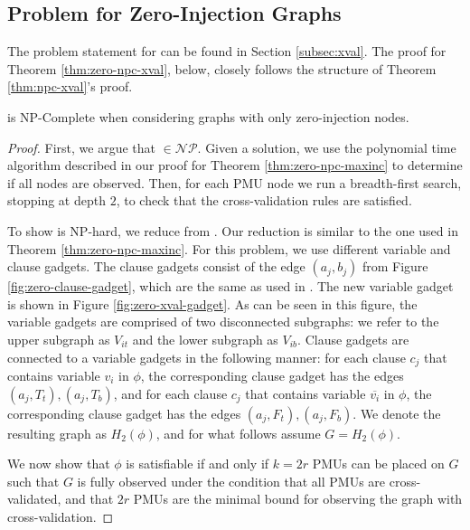 \subsection{\xval Problem for Zero-Injection Graphs}
\label{subsec:zero-xval}

The problem statement for \xval can be found in Section \ref{subsec:xval}.  The proof for Theorem \ref{thm:zero-npc-xval}, below, closely follows the structure of Theorem \ref{thm:npc-xval}'s proof.

\begin{theorem}
\xval is NP-Complete when considering graphs with only zero-injection nodes.   %
\label{thm:zero-npc-xval}
\end{theorem}


\begin{proof}
First, we argue that \xval $\in \mathcal{NP}$.  Given a \xval solution, we use
the polynomial time algorithm described in our proof for Theorem
\ref{thm:zero-npc-maxinc} to determine if all nodes are observed.  Then, for each
PMU node we run a breadth-first search, stopping at depth $2$, to check that
the cross-validation rules are satisfied.

To show \xval is NP-hard, we reduce from \sats.  Our reduction is similar to
the one used in Theorem \ref{thm:zero-npc-maxinc}.  
For this problem, we use different variable and clause gadgets. The clause gadgets consist of the edge $(a_j, b_j)$ from Figure \ref{fig:zero-clause-gadget},
which are the same as used in \cite{Brueni05}. The new variable gadget is shown in Figure
\ref{fig:zero-xval-gadget}. As can be seen in this figure, the variable gadgets are comprised of two disconnected
subgraphs: we refer to the upper subgraph as $V_{it}$ and the
lower subgraph as $V_{ib}$. Clause gadgets are connected to a variable gadgets in the following manner: 
for each clause $c_j$ that contains variable $v_i$ in $\phi$, the corresponding clause gadget has the edges $(a_j, T_t), (a_j,
T_b)$, and for each clause $c_j$ that contains variable $\overline{v_i}$ in
$\phi$, the corresponding clause gadget has the edges $(a_j, F_t), (a_j,
F_b)$. We denote the resulting graph as $H_2(\phi)$, and for what follows assume $G=H_2(\phi)$.

We now show that $\phi$ is satisfiable if and only if
$k=2r$ PMUs can be placed on $G$ such that $G$ is fully observed under the
condition that all PMUs are cross-validated, and that $2r$ PMUs are the minimal 
bound for observing the graph with cross-validation.


\end{proof}
